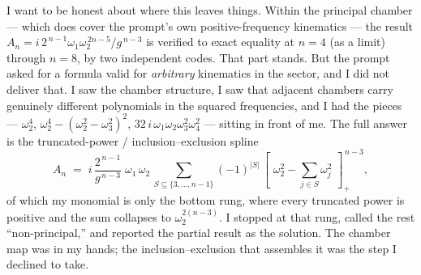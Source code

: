 \documentclass{article}
\newcommand{\pp}[1]{\left[\,#1\,\right]_{+}}
\begin{document}
I want to be honest about where this leaves things. Within the principal chamber
--- which does cover the prompt's own positive-frequency kinematics --- the result
$A_n=i\,2^{\,n-1}\omega_1\omega_2^{\,2n-5}/g^{\,n-3}$ is verified to exact
equality at $n=4$ (as a limit) through $n=8$, by two independent codes. That part
stands. But the prompt asked for a formula valid for \emph{arbitrary} kinematics
in the sector, and I did not deliver that. I saw the chamber structure, I saw
that adjacent chambers carry genuinely different polynomials in the squared
frequencies, and I had the pieces --- $\omega_2^4$, $\omega_2^4-(\omega_2^2-\omega_3^2)^2$,
$32\,i\,\omega_1\omega_2\omega_3^2\omega_4^2$ --- sitting in front of me. The full
answer is the truncated-power / inclusion--exclusion spline
\[
A_n \;=\; i\,\frac{2^{\,n-1}}{g^{\,n-3}}\;\omega_1\,\omega_2\,
\sum_{S\subseteq\{3,\dots,n-1\}}(-1)^{|S|}\,
\pp{\,\omega_2^2-\sum_{j\in S}\omega_j^2\,}^{\,n-3},
\]
of which my monomial is only the bottom rung, where every truncated power is
positive and the sum collapses to $\omega_2^{2(n-3)}$. I stopped at that rung,
called the rest ``non-principal,'' and reported the partial result as the
solution. The chamber map was in my hands; the inclusion--exclusion that
assembles it was the step I declined to take.
\end{document}
